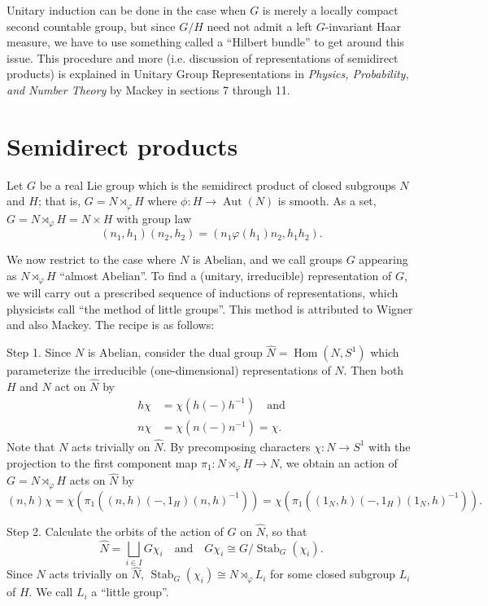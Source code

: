 \documentclass[11pt,leqno]{article}
\theoremstyle{plain}
\theoremstyle{definition}
\numberwithin{equation}{section}
\numberwithin{lem}{section}
\DeclareMathOperator{\Stab}{Stab}
\DeclareMathOperator{\Aut}{Aut}
\DeclareMathOperator{\Hom}{Hom}
\begin{document}
Unitary induction can be done in the case when $G$ is merely a locally compact second countable group, but since $G/H$ need not admit a left $G$-invariant Haar measure, we have to use something called a ``Hilbert bundle'' to get around this issue. This procedure and more (i.e. discussion of representations of semidirect products) is explained in Unitary Group Representations in \textit{Physics, Probability, and Number Theory} by Mackey in sections 7 through 11.

\section{Semidirect products}
Let $G$ be a real Lie group which is the semidirect product of closed subgroups $N$ and $H$; that is, $G = N\rtimes_\varphi H$ where $\phi\colon H\to \Aut(N)$ is smooth. As a set, $G = N\rtimes_\varphi H = N\times H$ with group law
\[(n_1,h_1)(n_2,h_2) = (n_1\varphi(h_1)n_2,h_1h_2).\]

We now restrict to the case where $N$ is Abelian, and we call groups $G$ appearing as $N\rtimes_\varphi H$ ``almost Abelian''. To find a (unitary, irreducible) representation of $G$, we will carry out a prescribed sequence of inductions of representations, which physicists call ``the method of little groups''. This method is attributed to Wigner and also Mackey. The recipe is as follows:

Step 1. Since $N$ is Abelian, consider the dual group $\widehat N = \Hom(N,S^1)$ which parameterize the irreducible (one-dimensional) representations of $N$. Then both $H$ and $N$ act on $\widehat N$ by 
\begin{align*}
	h\chi &= \chi(h(-)h^{-1})\quad\text{and}\\
	n\chi &= \chi(n(-)n^{-1}) = \chi.
\end{align*}
Note that $N$ acts trivially on $\widehat N$. By precomposing characters $\chi\colon N\to S^1$ with the projection to the first component map $\pi_1\colon N\rtimes_\varphi H\to N$, we obtain an action of $G = N\rtimes_\varphi H$ acts on $\widehat N$ by 
\[(n,h)\chi = \chi(\pi_1((n,h)(-,1_H)(n,h)^{-1})) = \chi(\pi_1((1_N,h)(-,1_H)(1_N,h)^{-1})).\]

Step 2. Calculate the orbits of the action of $G$ on $\widehat N$, so that 
\[\widehat N = \bigsqcup_{i\in I}G\chi_i\quad\text{and}\quad G\chi_i\cong G/\Stab_G(\chi_i).\]
Since $N$ acts trivially on $\widehat N$, $\Stab_G(\chi_i)\cong N\rtimes_\varphi L_i$ for some closed subgroup $L_i$ of $H$. We call $L_i$ a ``little group''.
\end{document}
